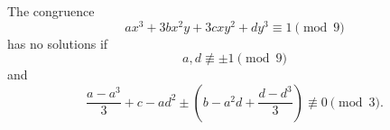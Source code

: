 \begin{proposition}
    The congruence
\[
    ax^3+3bx^2y+3cxy^2+dy^3\equiv1\pmod 9
\]
    has no solutions if
\[
    a,d\not\equiv\pm1\pmod9
\]
    and
\[
    \frac{a-a^3}{3}+c-ad^2
    \pm\left(b-a^2d+\frac{d-d^3}{3}\right)
    \not\equiv0\pmod3.
\]
\end{proposition}
